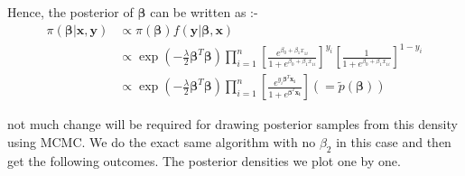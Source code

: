 \documentclass[11pt,english]{article}\usepackage[]{graphicx}\usepackage[]{xcolor}
\begin{document}
Hence, the posterior of $\boldsymbol{\beta}$ can be written as :-
\begin{align*}
\pi\left(\boldsymbol{\beta}|\boldsymbol{x},\boldsymbol{y}\right) & \propto\pi\left(\boldsymbol{\beta}\right)f\left(\boldsymbol{y}|\boldsymbol{\beta},\boldsymbol{x}\right)\\
 & \propto\exp\left(-\frac{\lambda}{2}\boldsymbol{\beta}^{T}\boldsymbol{\beta}\right)\prod_{i=1}^{n}\left[\frac{e^{\beta_{0}+\beta_{1}x_{1i}}}{1+e^{\beta_{0}+\beta_{1}x_{1i}}}\right]^{y_{i}}\left[\frac{1}{1+e^{\beta_{0}+\beta_{1}x_{1i}}}\right]^{1-y_{i}}\\
 & \propto\exp\left(-\frac{\lambda}{2}\boldsymbol{\beta}^{T}\boldsymbol{\beta}\right)\prod\limits _{i=1}^{n}\left[\frac{e^{y_{i}\boldsymbol{\beta}^{T}\boldsymbol{x_{i}}}}{1+e^{\boldsymbol{\beta}^{T}\boldsymbol{x_{i}}}}\right]\left(=\widetilde{p}\left(\boldsymbol{\beta}\right)\right)
\end{align*}

not much change will be required for drawing posterior samples from
this density using MCMC. We do the exact same algorithm with no $\beta_{2}$
in this case and then get the following outcomes. The posterior densities
we plot one by one.
\end{document}
